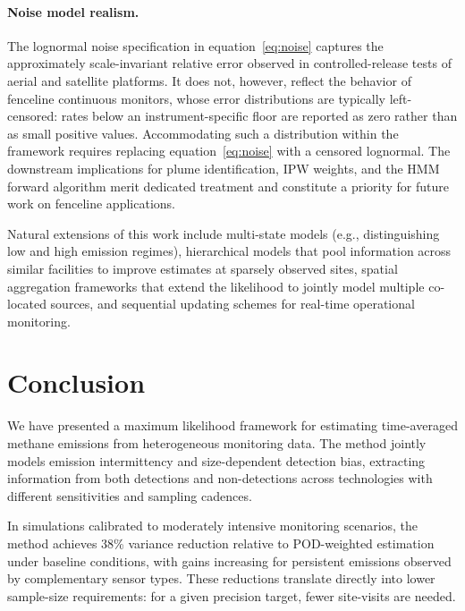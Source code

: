 \documentclass[unnumsec,webpdf,modern,mediumone]{oup-authoring-template}
\newcommand{\new}[1]{{\color{blue}#1}}
\newcommand{\edit}[1]{{\color{magenta}#1}}
\begin{document}
\new{\paragraph{Noise model realism.} The lognormal noise specification in equation~\eqref{eq:noise} captures the approximately scale-invariant relative error observed in controlled-release tests of aerial and satellite platforms. It does not, however, reflect the behavior of fenceline continuous monitors, whose error distributions are typically left-censored: rates below an instrument-specific floor are reported as zero rather than as small positive values. Accommodating such a distribution within the framework requires replacing equation~\eqref{eq:noise} with a censored lognormal. The downstream implications for plume identification, IPW weights, and the HMM forward algorithm merit dedicated treatment and constitute a priority for future work on fenceline applications.}

Natural extensions of this work include multi-state models (e.g., distinguishing low and high emission regimes), hierarchical models that pool information across similar facilities to improve estimates at sparsely observed sites, spatial aggregation frameworks that extend the likelihood to jointly model multiple co-located sources, and sequential updating schemes for real-time operational monitoring.


\section{Conclusion}
\label{sec:conclusion}

We have presented a maximum likelihood framework for estimating time-averaged methane emissions from heterogeneous monitoring data. The method jointly models emission intermittency and size-dependent detection bias, extracting information from both detections and non-detections across technologies with different sensitivities and sampling cadences.

In simulations calibrated to \edit{moderately intensive monitoring scenarios}, the method achieves \edit{38\%} variance reduction relative to POD-weighted estimation under baseline conditions, with gains increasing for persistent emissions observed by complementary sensor types. These reductions translate directly into lower sample-size requirements: for a given precision target, fewer site-visits are needed.
\end{document}
